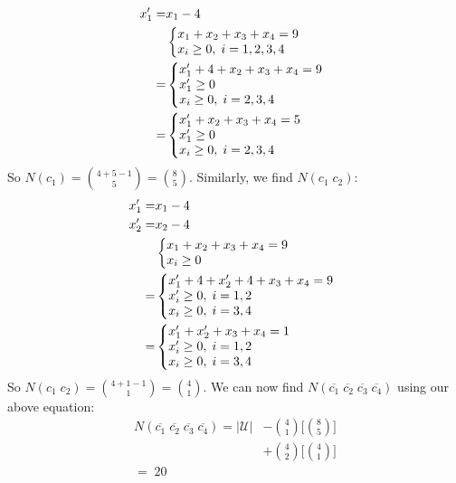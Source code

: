 \documentclass{article}
\begin{document}
\begin{align*}
	x'_1=&x_1-4\\
	&\left\{
	\begin{array}{@{}ll@{}}
		x_1+x_2+x_3+x_4=9\\
		x_i\ge0,\;i=1,2,3,4
	\end{array}\right.\\
	=&\left\{
	\begin{array}{@{}ll@{}}
		x'_1+4+x_2+x_3+x_4=9\\
		x'_1\ge0\\
		x_i\ge0,\;i=2,3,4
	\end{array}\right.\\
	=&\left\{
	\begin{array}{@{}ll@{}}
		x'_1+x_2+x_3+x_4=5\\
		x'_1\ge0\\
		x_i\ge0,\;i=2,3,4
	\end{array}\right.
\end{align*}
So $N(c_1)=\binom{4+5-1}{5}=\binom{8}{5}$.
\newline
\newline
Similarly, we find $N(c_1\;c_2)$:
\begin{align*}
	x'_1=&x_1-4\\
	x'_2=&x_2-4\\
	&\left\{
	\begin{array}{@{}ll@{}}
		x_1+x_2+x_3+x_4=9\\
		x_i\ge0
	\end{array}\right.\\
	=&\left\{
	\begin{array}{@{}ll@{}}
		x'_1+4+x'_2+4+x_3+x_4=9\\
		x'_i\ge0,\;i=1,2\\
		x_i\ge0,\;i=3,4
	\end{array}\right.\\
	=&\left\{
	\begin{array}{@{}ll@{}}
		x'_1+x'_2+x_3+x_4=1\\
		x'_i\ge0,\;i=1,2\\
		x_i\ge0,\;i=3,4
	\end{array}\right.
\end{align*}
So $N(c_1\;c_2)=\binom{4+1-1}{1}=\binom{4}{1}$.
We can now find $N(\overline{c_1}\;\overline{c_2}\;\overline{c_3}\;\overline{c_4})$
using our above equation:
\begin{align*}
	N(\overline{c_1}\;\overline{c_2}\;\overline{c_3}\;\overline{c_4})=
	|\mathcal{U}|
	&-\binom{4}{1}\bigg[\binom{8}{5}\bigg]\\
	&+\binom{4}{2}\bigg[\binom{4}{1}\bigg]\\
	=\;20
\end{align*}
\end{document}
